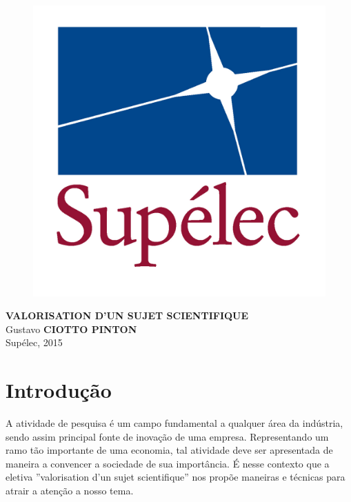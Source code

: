 \documentclass{article}
\begin{document}
\begin{titlepage}
\vspace*{.28\textheight}
\begin{center}
%
\begin{figure}[h]
    \centering
    \includegraphics[scale=0.12]{images/LogoSupelec}
\end{figure}
%
\vspace*{10pt}
\textbf{\LARGE{VALORISATION D'UN SUJET SCIENTIFIQUE}}\\[2 cm]
Gustavo \textbf{CIOTTO PINTON}\\[1 cm]
Supélec, 2015

\end{center}
\end{titlepage}

\newpage

\section{Introdução}

A atividade de pesquisa é um campo fundamental a qualquer área da indústria,
sendo assim principal fonte de inovação de uma empresa. Representando um ramo
tão importante de uma economia, tal atividade deve ser apresentada de maneira a
convencer a sociedade de sua importância. É nesse contexto que a eletiva
''valorisation d'un sujet scientifique'' nos propõe maneiras e técnicas para
atrair a atenção a nosso tema.
\end{document}
